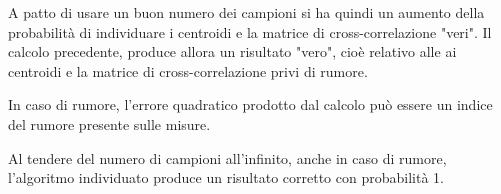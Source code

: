 A patto di usare un buon numero dei campioni si ha quindi un aumento della probabilità di individuare i centroidi e la matrice di cross-correlazione "veri". Il calcolo precedente, produce allora un risultato "vero", cioè relativo alle ai centroidi e la matrice di cross-correlazione privi di rumore.

In caso di rumore, l'errore quadratico prodotto dal calcolo può essere un indice del rumore presente sulle misure.

Al tendere del numero di campioni all'infinito, anche in caso di rumore, l'algoritmo individuato produce un risultato corretto con probabilità 1.



